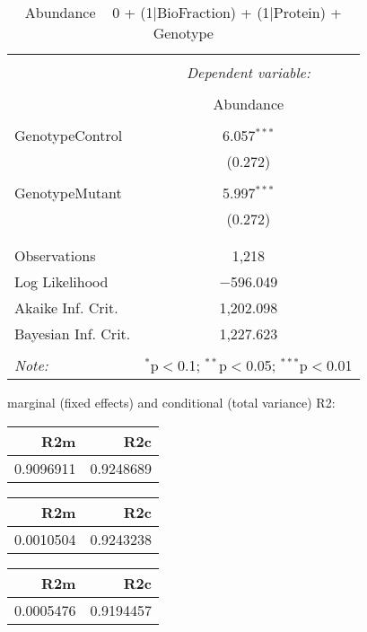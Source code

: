 \documentclass[11pt]{report}
\begin{document}
\begin{table}[!htbp] \centering 
  \caption{Abundance ~ 0 + (1|BioFraction) + (1|Protein) + Genotype} 
  \label{} 
\begin{tabular}{@{\extracolsep{5pt}}lc} 
\\[-1.8ex]\hline 
\hline \\[-1.8ex] 
 & \multicolumn{1}{c}{\textit{Dependent variable:}} \\ 
\cline{2-2} 
\\[-1.8ex] & Abundance \\ 
\hline \\[-1.8ex] 
 GenotypeControl & 6.057$^{***}$ \\ 
  & (0.272) \\ 
  & \\ 
 GenotypeMutant & 5.997$^{***}$ \\ 
  & (0.272) \\ 
  & \\ 
\hline \\[-1.8ex] 
Observations & 1,218 \\ 
Log Likelihood & $-$596.049 \\ 
Akaike Inf. Crit. & 1,202.098 \\ 
Bayesian Inf. Crit. & 1,227.623 \\ 
\hline 
\hline \\[-1.8ex] 
\textit{Note:}  & \multicolumn{1}{r}{$^{*}$p$<$0.1; $^{**}$p$<$0.05; $^{***}$p$<$0.01} \\ 
\end{tabular} 
\end{table} 
marginal (fixed effects) and conditional (total variance) R2:

\begin{tabular}{r|r}
\hline
R2m & R2c\\
\hline
0.9096911 & 0.9248689\\
\hline
\end{tabular}

\begin{tabular}{r|r}
\hline
R2m & R2c\\
\hline
0.0010504 & 0.9243238\\
\hline
\end{tabular}

\begin{tabular}{r|r}
\hline
R2m & R2c\\
\hline
0.0005476 & 0.9194457\\
\hline
\end{tabular}
\end{document}
